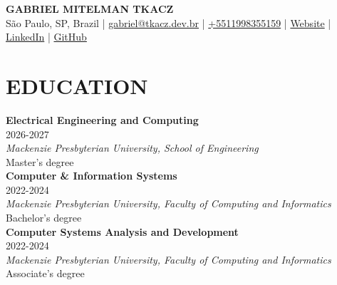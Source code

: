\documentclass[a4paper,9pt]{extarticle}
\begin{document}
\pagestyle{empty}

\begin{center}
\textbf{\Large GABRIEL MITELMAN TKACZ }\\[3pt] %
São Paulo, SP, Brazil | \href{mailto:gabriel@tkacz.dev.br}{gabriel@tkacz.dev.br} | \href{tel:+5511998355159}{+5511998355159} | \href{https://www.tkacz.dev.br/}{Website} | \href{https://www.linkedin.com/in/gtkacz/}{LinkedIn} | \href{https://github.com/gtkacz}{GitHub} %
\end{center}


\section*{EDUCATION}

\noindent
\textbf{Electrical Engineering and Computing} \\
2026-2027 \\
\textit{Mackenzie Presbyterian University, School of Engineering} \\
Master's degree \\

\noindent
\textbf{Computer \& Information Systems} \\
2022-2024 \\
\textit{Mackenzie Presbyterian University, Faculty of Computing and Informatics} \\
Bachelor's degree \\

\noindent
\textbf{Computer Systems Analysis and Development} \\
2022-2024 \\
\textit{Mackenzie Presbyterian University, Faculty of Computing and Informatics} \\
Associate's degree
\end{document}
